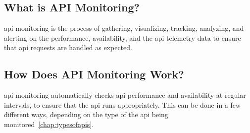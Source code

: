 \begin{multicols}{2}
      \subsection{What is API Monitoring?}
      \acrshort{api} monitoring is the process of gathering, visualizing, tracking, analyzing, and alerting on the
      performance, availability, and the \acrshort{api} telemetry data to ensure that \acrshort{api} requests are
      handled as expected.
      \subsection{How Does API Monitoring Work?}
      \acrshort{api} monitoring automatically checks \acrshort{api} performance and availability at regular intervals,
      to ensure that the \acrshort{api} runs appropriately. This can be done in a few different ways, depending on the
      type of the \acrshort{api} being monitored~\ref{chap:typesofapis}.


\end{multicols}
